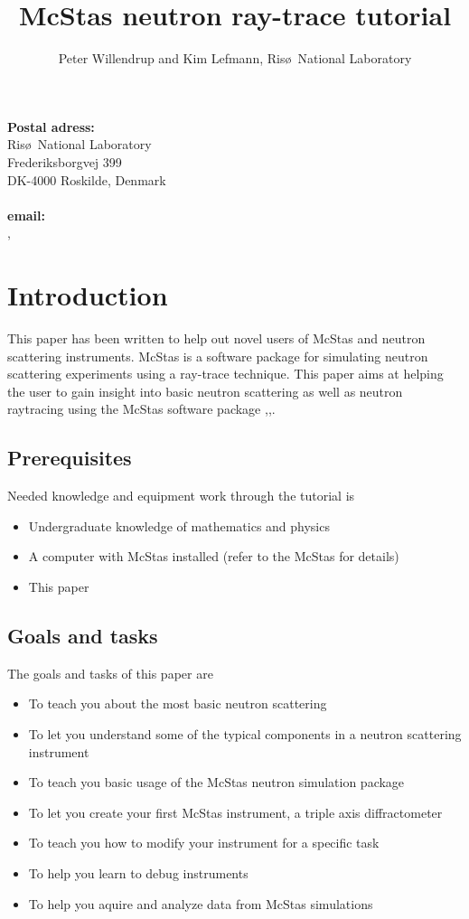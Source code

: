\documentclass[a4paper]{article}
\title{McStas neutron ray-trace tutorial}
\author{Peter Willendrup and Kim Lefmann, Ris\o\ National Laboratory}
\begin{document}
\maketitle
{\noindent \small {\bf Postal adress:}\\
Ris\o\ National Laboratory\\Frederiksborgvej 399\\DK-4000
  Roskilde, Denmark\\\ \\{\bf email:}\\,}
\section{Introduction}
This paper has been written to help out novel users of McStas and neutron
scattering instruments. McStas is a software package for simulating
neutron scattering experiments using a ray-trace technique. This paper 
aims at helping the user to gain insight into basic neutron scattering 
as well as neutron raytracing using the McStas software package
\cite{McStas0},\cite{Manual},\cite{Websites}.
\subsection{Prerequisites}
Needed knowledge and equipment work through the tutorial is
\begin{itemize}
\item{Undergraduate knowledge of mathematics and physics}
\item{A computer with McStas installed (refer to the McStas
     \cite{Websites} for details)}
\item{This paper}
\end{itemize}
\subsection{Goals and tasks}
The goals and tasks of this paper are
\begin{itemize}
\item{To teach you about the most basic neutron scattering}
\item{To let you understand some of the typical components in a
    neutron scattering instrument}
\item{To teach you basic usage of the McStas neutron simulation
    package}
\item{To let you create your first McStas instrument, a triple axis
    diffractometer}
\item{To teach you how to modify your instrument for a specific task}
\item{To help you learn to debug instruments}
\item{To help you aquire and analyze data from McStas simulations}
\end{itemize}
\end{document}
